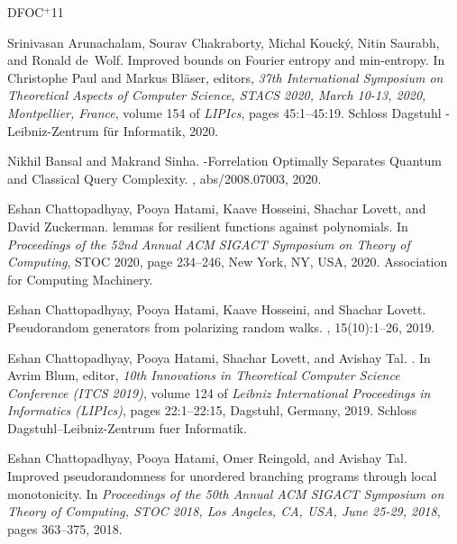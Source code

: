 \documentclass[10pt,a4paper]{article}
\theoremstyle{definition}
\begin{document}
\newcommand{\etalchar}[1]{$^{#1}$}
\begin{thebibliography}{DFOC{\etalchar{+}}11}

\bibitem[ACK{\etalchar{+}}20]{DBLP:conf/stacs/Arunachalam0KSW20}
Srinivasan Arunachalam, Sourav Chakraborty, Michal Kouck{\'{y}}, Nitin Saurabh,
  and Ronald de~Wolf.
\newblock Improved bounds on {F}ourier entropy and min-entropy.
\newblock In Christophe Paul and Markus Bl{\"{a}}ser, editors, {\em 37th
  International Symposium on Theoretical Aspects of Computer Science, {STACS}
  2020, March 10-13, 2020, Montpellier, France}, volume 154 of {\em LIPIcs},
  pages 45:1--45:19. Schloss Dagstuhl - Leibniz-Zentrum f{\"{u}}r Informatik,
  2020.

Nikhil Bansal and Makrand Sinha.
-{F}orrelation {O}ptimally {S}eparates {Q}uantum and {C}lassical
  {Q}uery {C}omplexity.
, abs/2008.07003, 2020.

\bibitem[CHH{\etalchar{+}}20]{xorlemma}
Eshan Chattopadhyay, Pooya Hatami, Kaave Hosseini, Shachar Lovett, and David
  Zuckerman.
 lemmas for resilient functions against polynomials.
\newblock In {\em Proceedings of the 52nd Annual ACM SIGACT Symposium on Theory
  of Computing}, STOC 2020, page 234–246, New York, NY, USA, 2020.
  Association for Computing Machinery.

Eshan Chattopadhyay, Pooya Hatami, Kaave Hosseini, and Shachar Lovett.
\newblock Pseudorandom generators from polarizing random walks.
, 15(10):1--26, 2019.

Eshan Chattopadhyay, Pooya Hatami, Shachar Lovett, and Avishay Tal.
.
\newblock In Avrim Blum, editor, {\em 10th Innovations in Theoretical Computer
  Science Conference (ITCS 2019)}, volume 124 of {\em Leibniz International
  Proceedings in Informatics (LIPIcs)}, pages 22:1--22:15, Dagstuhl, Germany,
  2019. Schloss Dagstuhl--Leibniz-Zentrum fuer Informatik.

Eshan Chattopadhyay, Pooya Hatami, Omer Reingold, and Avishay Tal.
\newblock Improved pseudorandomness for unordered branching programs through
  local monotonicity.
\newblock In {\em Proceedings of the 50th Annual {ACM} {SIGACT} Symposium on
  Theory of Computing, {STOC} 2018, Los Angeles, CA, USA, June 25-29, 2018},
  pages 363--375, 2018.


\end{thebibliography}
\end{document}
